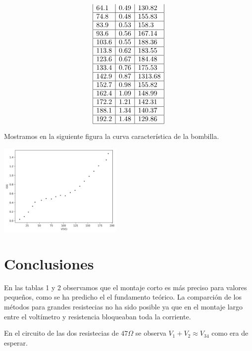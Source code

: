 \documentclass{article}
\begin{document}
\begin{multicols}{2}
\begin{center}
$$\begin{array}{|l|l|l|}
    64.1 & 0.49 & 130.82  \\ \hline
    74.8 & 0.48 & 155.83  \\ \hline
    83.9 & 0.53 & 158.3  \\ \hline
    93.6 & 0.56 & 167.14  \\ \hline
    103.6 & 0.55 & 188.36  \\ \hline
    113.8 & 0.62 & 183.55  \\ \hline
    123.6 & 0.67 & 184.48  \\ \hline
    133.4 & 0.76 & 175.53  \\ \hline
    142.9 & 0.87 & 1313.68  \\ \hline
    152.7 & 0.98 & 155.82  \\ \hline
    162.4 & 1.09 & 148.99  \\ \hline
    172.2 & 1.21 & 142.31  \\ \hline
    188.1 & 1.34 & 140.37  \\ \hline
    192.2 & 1.48 & 129.86  \\ \hline
    \end{array}
  $$
\end{center}
Mostramos en la siguiente figura la curva característica de la bombilla.
\begin{center}
  \includegraphics[width=0.45\textwidth]{figures/curva.png}
\end{center}

\section*{Conclusiones}
En las tablas 1 y 2 observamos que el montaje corto es más preciso para valores pequeños, como se ha predicho el el fundamento teórico. La comparción de los métodos para grandes resistecias no ha sido posible ya que en el montaje largo entre el voltímetro y resistencia bloqueaban toda la corriente.

En el circuito de las dos resistecias de $47\Omega$ se observa $V_1 + V_2 \approx V_34$ como era de esperar.


\end{multicols}
\end{document}
